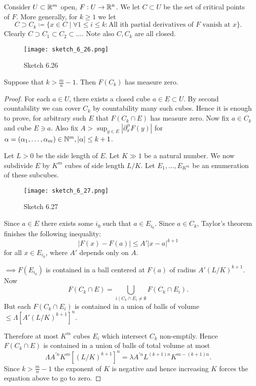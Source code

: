  Consider \(U\subset\mathbb{R}^m\) open, \(F:U\to \mathbb{R}^n\). We let \(C\subset U\)
be the set of critical points of \(F\). More generally, for \(k\geq 1\) we let 
\[C\supset C_k\coloneqq \{x\in C\mid \forall 1\leq i\leq k: \text{All ith partial derivatives of }F\text{ vanish at }x\}.\]
Clearly \(C\supset C_1\subset C_2\subset \dots \). Note also \(C,C_k\) are all closed.
\begin{figure}[H]\label{fig:6.26}
    \centering
    \texttt{[image: sketch\_6\_26.png]}
    \caption{Sketch 6.26}
\end{figure}

\begin{lemma}\label{lem:6.14}
    Suppose that \(k>\frac{m}{n}-1\). Then \(F(C_k)\) has measure zero.
\end{lemma}

\begin{proof}
    For each \(a\in U\), there exists a closed cube \(a\in E\subset U\). By second countability 
    we can cover \(C_k\) by countability many such cubes. Hence it is enough to prove, for arbitrary 
    such \(E\) that \(F(C_k\cap E)\) has measure zero. Now fix \(a\in C_k\) and cube \(E\ni a\). Also 
    fix \(A>\sup_{y\in E}|\partial_x^{\alpha} F(y)|\) for \(\alpha=(\alpha_1,\dots,\alpha_m)\in \mathbb{N}^m,|\alpha|\leq k+1\).

    Let \(L>0\) be the side length of \(E\). Let \(K\gg 1\) be a natural number.
    We now subdivide \(E\) by \(K^m\) cubes of side length  \(L/K\). Let \(E_1,\dots,E_{K^m}\) be 
    an enumeration of these subcubes.
    \begin{figure}[H]\label{fig:6.27}
        \centering
        \texttt{[image: sketch\_6\_27.png]}
        \caption{Sketch 6.27}
    \end{figure}
    Since \(a\in E\) there exists some \(i_0\) such that \(a\in E_{i_0}\).
    Since \(a\in C_k\), Taylor's theorem finishes the following inequality:
    \[|F(x)-F(a)|\leq A'|x-a|^{k+1}\] 
    for all \(x\in E_{i_0}\), where \(A'\) depends only on \(A\).

    \(\implies F(E_{i_0})\) is contained in a ball centered at \(F(a)\) of radius \(A'(L/K)^{k+1}\). 
    Now \[F(C_k\cap E)=\bigcup_{i\mid C_k\cap E_i\neq \emptyset} F(C_k\cap E_i).\]
    But each \(F(C_k\cap E_i)\) is contained in a union of balls of volume \(\leq \Lambda\left[A'(L/K)^{k+1}\right]^n\).

    Therefore at most \(K^m\) cubes \(E_i\) which intersect \(C_k\) non-emptily. Hence \(F(C_k\cap E)\)
    is contained in a union of balls of total volume at most 
    \[\Lambda A^{' n} K^m\left[(L/K)^{k+1}\right]^n = \lambda A^{' n} L^{(k+1)n}K^{m-(k+1)n}.\]
    Since \(k> \frac{m}{n}-1\) the exponent of \(K\) is negative and hence increasing \(K\)
    forces the equation above to go to zero.
\end{proof}

